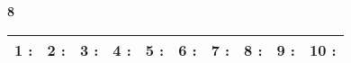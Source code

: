 \documentclass[a4paper, 11pt]{article}
\begin{document}
{\Large\bf 8 } \hspace{1.5cm}
\begin{tabular}{| l|l|l|l|l|l|l|l|l|l| }
\hline
{\large 1 }: \hspace*{0.5cm}
& {\large 2 }: \hspace*{0.5cm}
& {\large 3 }: \hspace*{0.5cm}
& {\large 4 }: \hspace*{0.5cm}
& {\large 5 }: \hspace*{0.5cm}
& {\large 6 }: \hspace*{0.5cm}
& {\large 7 }: \hspace*{0.5cm}
& {\large 8 }: \hspace*{0.5cm}
& {\large 9 }: \hspace*{0.5cm}
& {\large 10 }: \hspace*{0.5cm}
\\ 
 \hline
\end{tabular}
\vspace*{1cm} 
\end{document}

